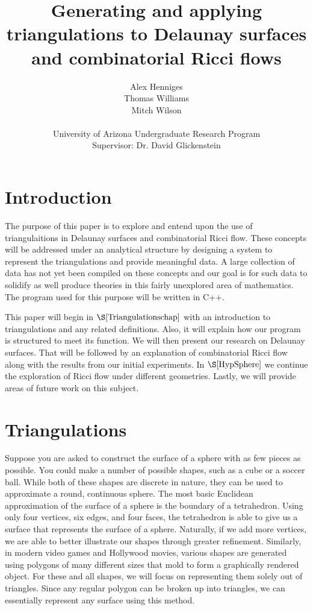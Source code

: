 \documentclass[12pt]{article}
\title{Generating and applying triangulations to Delaunay surfaces and combinatorial Ricci flows}
\author{Alex Henniges \\ Thomas Williams \\ Mitch Wilson \\ \\ University of Arizona Undergraduate Research Program\\
Supervisor: Dr. David Glickenstein\\
}
\begin{document}
\maketitle
\thispagestyle{empty}
\newpage
\renewcommand\contentsname{Table of Contents}
\tableofcontents

\newpage
\section{Introduction}

The purpose of this paper is to explore and entend upon the use of triangulaitions in Delaunay surfaces and combinatorial Ricci flow. These concepts will be addressed under an analytical structure by designing a system to represent the triangulations and provide meaningful data. A large collection of data has not yet been compiled on these concepts and our goal is for such data to solidify as well produce theories in this fairly unexplored area of mathematics. The program used for this purpose will be written in C++.\newline

\noindent This paper will begin in $\S\ref{Triangulationschap}$ with an introduction to triangulations and any related definitions. Also, it will explain how our program is structured to meet its function. We will then present our research on Delaunay surfaces. That will be followed by an explanation of combinatorial Ricci flow along with the results from our initial experiments. In $\S\ref{HypSphere}$ we continue the exploration of Ricci flow under different geometries. Lastly, we will provide areas of future work on this subject.

\section{Triangulations}
\label{Triangulationschap}

Suppose you are asked to construct the surface of a sphere with as few pieces as possible. You could make a number of possible shapes, such as a cube or a soccer ball. While both of these shapes are discrete in nature, they can be used to approximate a round, continuous sphere. The most basic Euclidean approximation of the surface of a sphere is the boundary of a tetrahedron. Using only four vertices, six edges, and four faces, the tetrahedron is able to give us a surface that represents the surface of a sphere. Naturally, if we add more vertices, we are able to better illustrate our shapes through greater refinement. Similarly, in modern video games and Hollywood movies, various shapes are generated using polygons of many different sizes that mold to form a graphically rendered object. For these and all shapes, we will focus on representing them solely out of triangles. Since any regular polygon can be broken up into triangles, we can essentially represent any surface using this method. \newline
\end{document}
